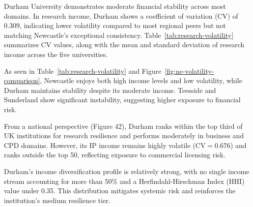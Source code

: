 \documentclass[journal,onecolumn, 10pt,draftclsnofoot]{IEEEtran}
\begin{document}
Durham University demonstrates moderate financial stability across most domains. In research income, Durham shows a coefficient of variation (CV) of 0.309, indicating lower volatility compared to most regional peers but not matching Newcastle's exceptional consistency. Table~\ref{tab:research-volatility} summarizes CV values, along with the mean and standard deviation of research income across the five universities.
\vspace{0.25cm}
\begin{table}[h]
\centering
\caption{Research Income Volatility Analysis - North East Universities}
\vspace{0.1cm}
\label{tab:research-volatility}
\end{table}

As seen in Table~\ref{tab:research-volatility} and Figure~\ref{fig:ne-volatility-comparison}, Newcastle enjoys both high income levels and low volatility, while Durham maintains stability despite its moderate income. Teesside and Sunderland show significant instability, suggesting higher exposure to financial risk.

From a national perspective (Figure 42), Durham ranks within the top third of UK institutions for research resilience and performs moderately in business and CPD domains. However, its IP income remains highly volatile ($\mathrm{CV}=0.676$) and ranks outside the top 50, reflecting exposure to commercial licensing risk.

Durham's income diversification profile is relatively strong, with no single income stream accounting for more than 50\% and a Herfindahl-Hirschman Index (HHI) value under 0.35. This distribution mitigates systemic risk and reinforces the institution's medium resilience tier.
\end{document}
